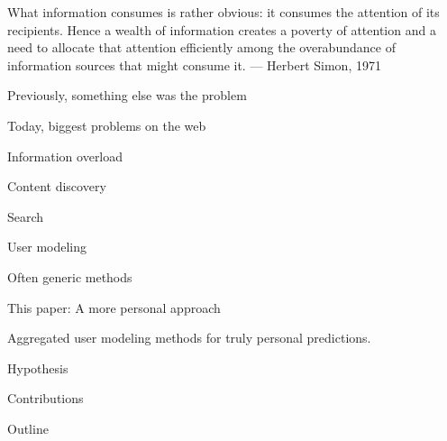 \begin{blockquote}
  \center
  What information consumes is rather obvious: it consumes the attention of its recipients. Hence a wealth of information creates a poverty
  of attention and a need to allocate that attention efficiently among the overabundance of information sources that might consume it.
  --- Herbert Simon, 1971 \cite{Greenberger1971} 
\end{blockquote}
\vspace{2em}




Previously, something else was the problem

Today, biggest problems on the web

Information overload

Content discovery

Search

User modeling

Often generic methods

This paper: A more personal approach

Aggregated user modeling methods for 
truly personal predictions.

Hypothesis

Contributions

Outline


